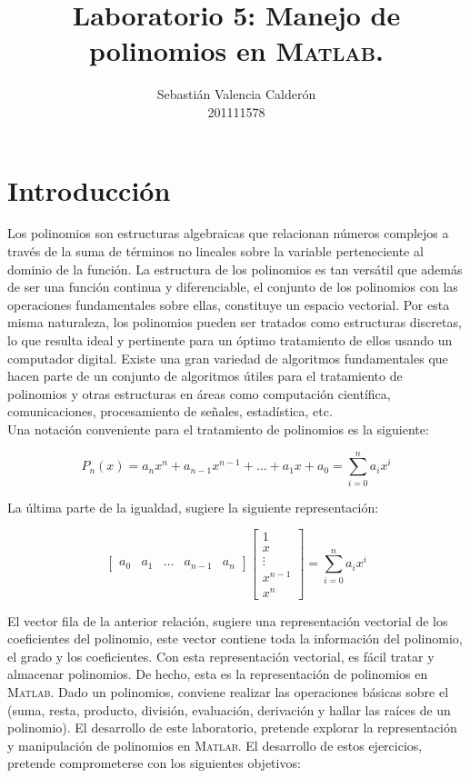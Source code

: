 \documentclass[11pt, spanish]{article}
\date{}
\begin{document}
\renewcommand\lstlistlistingname{Lista de Scripts}

\author{Sebastián Valencia Calderón \\ 201111578}
\title{Laboratorio 5: Manejo de polinomios en \textsc{Matlab}.}
\maketitle

\section{Introducción}

Los polinomios son estructuras algebraicas que relacionan números complejos a través de la suma de términos no lineales sobre la variable perteneciente al dominio de la función. La estructura de los polinomios es tan versátil que además de ser una función continua y diferenciable, el conjunto de los polinomios con las operaciones fundamentales sobre ellas, constituye un espacio vectorial. Por esta misma naturaleza, los polinomios pueden ser tratados como estructuras discretas, lo que resulta ideal y pertinente para un óptimo tratamiento de ellos usando un computador digital. Existe una gran variedad de algoritmos fundamentales que hacen parte de un conjunto de algoritmos útiles para el tratamiento de polinomios y otras estructuras en áreas como computación científica, comunicaciones, procesamiento de señales, estadística, etc.\\

Una notación conveniente para el tratamiento de polinomios es la siguiente:

$$P_n(x) = a_nx^n + a_{n-1}x^{n-1} + \dots + a_{1}x + a_{0} = \sum_{i = 0}^{n}a_{i}x^i$$

La última parte de la igualdad, sugiere la siguiente representación:

$$\begin{bmatrix}
    a_{0} & a_{1}  & \dots & a_{n - 1} & a_n 
\end{bmatrix} 
\begin{bmatrix}
    1 \\
    x \\
    \vdots \\
    x^{n-1} \\
    x^n    
\end{bmatrix} =  \sum_{i = 0}^{n}a_{i}x^i$$

El vector fila de la anterior relación, sugiere una representación vectorial de los coeficientes del polinomio, este vector contiene toda la información del polinomio, el grado y los coeficientes. Con esta representación vectorial, es fácil tratar y almacenar polinomios. De hecho, esta es la representación de polinomios en \textsc{Matlab}. Dado un polinomios, conviene realizar las operaciones básicas sobre el (suma, resta, producto, división, evaluación, derivación y hallar las raíces de un polinomio). El desarrollo de este laboratorio, pretende explorar la representación y manipulación de polinomios en \textsc{Matlab}. El desarrollo de estos ejercicios, pretende comprometerse con los siguientes objetivos:
\end{document}
